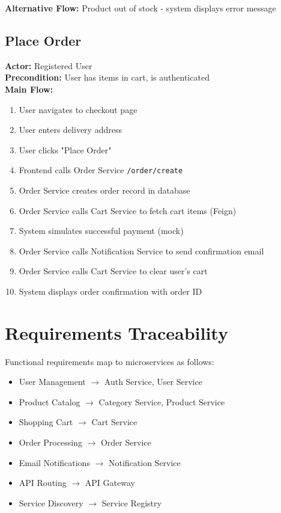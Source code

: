 \textbf{Alternative Flow:} Product out of stock - system displays error message

\subsection{Place Order}

\textbf{Actor:} Registered User\\
\textbf{Precondition:} User has items in cart, is authenticated\\
\textbf{Main Flow:}
\begin{enumerate}
    \item User navigates to checkout page
    \item User enters delivery address
    \item User clicks "Place Order"
    \item Frontend calls Order Service \texttt{/order/create}
    \item Order Service creates order record in database
    \item Order Service calls Cart Service to fetch cart items (Feign)
    \item System simulates successful payment (mock)
    \item Order Service calls Notification Service to send confirmation email
    \item Order Service calls Cart Service to clear user's cart
    \item System displays order confirmation with order ID
\end{enumerate}

\section{Requirements Traceability}

Functional requirements map to microservices as follows:
\begin{itemize}
    \item User Management $\rightarrow$ Auth Service, User Service
    \item Product Catalog $\rightarrow$ Category Service, Product Service
    \item Shopping Cart $\rightarrow$ Cart Service
    \item Order Processing $\rightarrow$ Order Service
    \item Email Notifications $\rightarrow$ Notification Service
    \item API Routing $\rightarrow$ API Gateway
    \item Service Discovery $\rightarrow$ Service Registry
\end{itemize}

